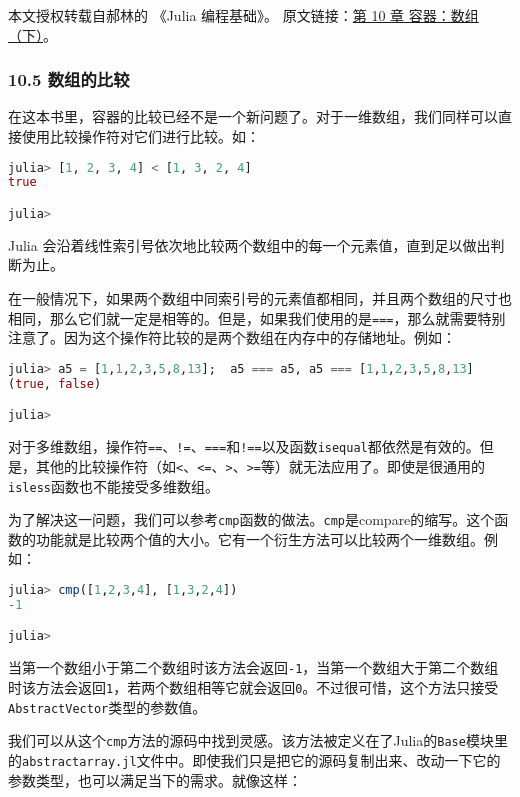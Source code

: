 
本文授权转载自郝林的 《Julia 编程基础》。 原文链接：\href{https://github.com/hyper0x/JuliaBasics/blob/master/book/ch10.md}{第 10 章 容器：数组（下）}。


\subsubsection{10.5 数组的比较}

在这本书里，容器的比较已经不是一个新问题了。对于一维数组，我们同样可以直接使用比较操作符对它们进行比较。如：

\begin{lstlisting}[language=julia]
julia> [1, 2, 3, 4] < [1, 3, 2, 4]
true

julia> 
\end{lstlisting}

Julia 会沿着线性索引号依次地比较两个数组中的每一个元素值，直到足以做出判断为止。

在一般情况下，如果两个数组中同索引号的元素值都相同，并且两个数组的尺寸也相同，那么它们就一定是相等的。但是，如果我们使用的是\verb|===|，那么就需要特别注意了。因为这个操作符比较的是两个数组在内存中的存储地址。例如：

\begin{lstlisting}[language=julia]
julia> a5 = [1,1,2,3,5,8,13];  a5 === a5, a5 === [1,1,2,3,5,8,13]
(true, false)

julia> 
\end{lstlisting}

对于多维数组，操作符\verb|==|、\verb|!=|、\verb|===|和\verb|!==|以及函数\verb|isequal|都依然是有效的。但是，其他的比较操作符（如\verb|<|、\verb|<=|、\verb|>|、\verb|>=|等）就无法应用了。即使是很通用的\verb|isless|函数也不能接受多维数组。

为了解决这一问题，我们可以参考\verb|cmp|函数的做法。\verb|cmp|是compare的缩写。这个函数的功能就是比较两个值的大小。它有一个衍生方法可以比较两个一维数组。例如：

\begin{lstlisting}[language=julia]
julia> cmp([1,2,3,4], [1,3,2,4])
-1

julia> 
\end{lstlisting}

当第一个数组小于第二个数组时该方法会返回\verb|-1|，当第一个数组大于第二个数组时该方法会返回\verb|1|，若两个数组相等它就会返回\verb|0|。不过很可惜，这个方法只接受\verb|AbstractVector|类型的参数值。

我们可以从这个\verb|cmp|方法的源码中找到灵感。该方法被定义在了Julia的\verb|Base|模块里的\verb|abstractarray.jl|文件中。即使我们只是把它的源码复制出来、改动一下它的参数类型，也可以满足当下的需求。就像这样：

